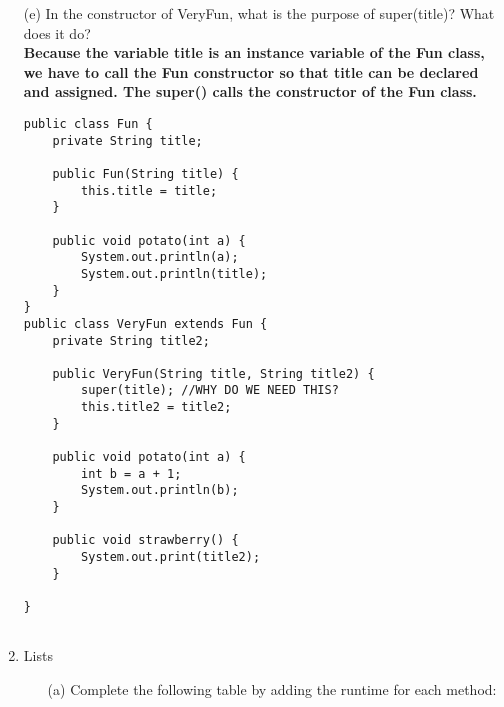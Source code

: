 \documentclass[letter]{article}
\begin{document}
\begin{enumerate} [1.]
\begin{itemize}
    \textbf{So why does ((DiceDisplay) B).showNumSides() work? When we perform type casting such as ((DiceDisplay) B), we change type of B from Display to DiceDisplay, thus we can now use methods that are defined in the DiceDisplay class.}\\     
    
    \end{itemize}


    \item [(e)] In the constructor of VeryFun, what is the purpose of super(title)? What does it do? \\
    
    \textbf{Because the variable title is an instance variable of the Fun class, we have to call the Fun constructor so that title can be declared and assigned. The \textbf{super()} calls the constructor of the Fun class.}

        \begin{verbatim}
public class Fun {
    private String title;

    public Fun(String title) {
        this.title = title;
    }
    
    public void potato(int a) {
        System.out.println(a);
        System.out.println(title);
    }
}
public class VeryFun extends Fun {
    private String title2;

    public VeryFun(String title, String title2) {
        super(title); //WHY DO WE NEED THIS?
        this.title2 = title2;
    }

    public void potato(int a) {
        int b = a + 1;
        System.out.println(b);
    }

    public void strawberry() {
        System.out.print(title2);
    }

}
        
        \end{verbatim}

    

    \item Lists
    \begin{itemize}
        \item [(a)] Complete the following table by adding the runtime for each method: 
        


\end{itemize}
\end{enumerate}
\end{document}
